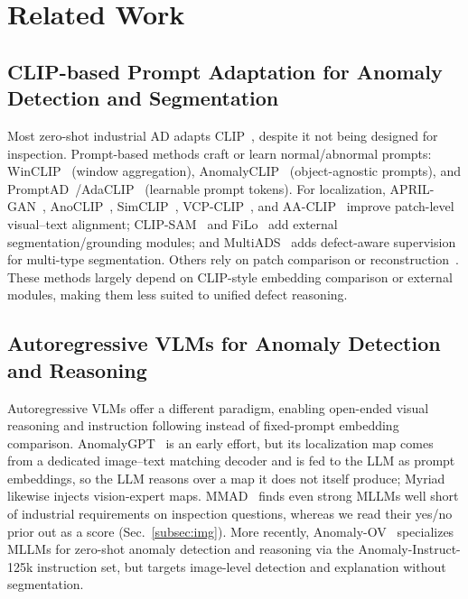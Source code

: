 \section{Related Work}
\subsection{CLIP-based Prompt Adaptation for Anomaly Detection and Segmentation}
Most zero-shot industrial AD adapts CLIP~\cite{radford2021}, despite it not being designed for inspection. Prompt-based methods craft or learn normal/abnormal prompts: WinCLIP~\cite{jeong2023winclip} (window aggregation), AnomalyCLIP~\cite{zhou2024anomalyclip} (object-agnostic prompts), and PromptAD~\cite{Li_2024_WACV}/AdaCLIP~\cite{Cao_2024} (learnable prompt tokens). For localization, APRIL-GAN~\cite{chen2023zero}, AnoCLIP~\cite{deng2024}, SimCLIP~\cite{simclip}, VCP-CLIP~\cite{qu2024vcpclip}, and AA-CLIP~\cite{ma2025aaclip} improve patch-level visual--text alignment; CLIP-SAM~\cite{li2024clipsamclipsamcollaboration} and FiLo~\cite{gu2024filozeroshotanomalydetection} add external segmentation/grounding modules; and MultiADS~\cite{sadikaj2025multiadsdefectawaresupervisionmultitype} adds defect-aware supervision for multi-type segmentation. Others rely on patch comparison or reconstruction~\cite{li2024musczeroshotindustrialanomaly,schwartz2024maeday,aota2023zero}. These methods largely depend on CLIP-style embedding comparison or external modules, making them less suited to unified defect reasoning.

\subsection{Autoregressive VLMs for Anomaly Detection and Reasoning}
Autoregressive VLMs offer a different paradigm, enabling open-ended visual reasoning and instruction following instead of fixed-prompt embedding comparison. AnomalyGPT~\cite{gu2023anomalygptdetectingindustrialanomalies} is an early effort, but its localization map comes from a dedicated image--text matching decoder and is fed to the LLM as prompt embeddings, so the LLM reasons over a map it does not itself produce; Myriad~\cite{li2023myriad} likewise injects vision-expert maps. MMAD~\cite{jiang2025mmad} finds even strong MLLMs well short of industrial requirements on inspection questions, whereas we read their yes/no prior out as a score (Sec.~\ref{subsec:img}). More recently, Anomaly-OV~\cite{xu2025towards} specializes MLLMs for zero-shot anomaly detection and reasoning via the Anomaly-Instruct-125k instruction set, but targets image-level detection and explanation without segmentation.


